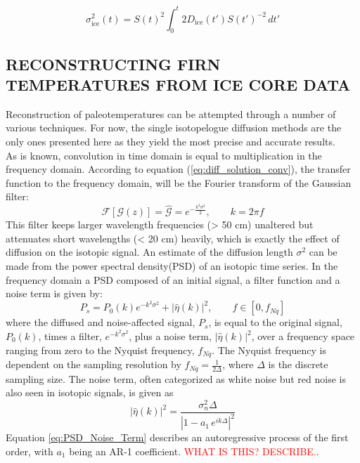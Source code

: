 \documentclass[11pt]{article}
\begin{document}
\begin{equation}
	\sigma^2_{\text{ice}}(t) = S(t)^2 \int_{0}^{t}2 D_{\text{ice}}(t') S(t')^{-2} \, dt'
	\label{eq:Diff_Len_Ice}
\end{equation}
\subsection{RECONSTRUCTING FIRN TEMPERATURES FROM ICE CORE DATA}
Reconstruction of paleotemperatures can be attempted through a number of various techniques. For now, the single isotopelogue diffusion methods are the only ones presented here as they yield the most precise and accurate results. 
\\
As is known, convolution in time domain is equal to multiplication in the frequency domain. According to equation (\ref{eq:diff_solution_conv}), the transfer function to the frequency domain, will be the Fourier transform of the Gaussian filter:
\begin{equation}
	\mathcal{F}[\mathcal{G}(z)] = \hat{\mathcal{G}} = e^{-\frac{k^2\sigma^2}{2}}, \qquad k = 2\pi f
	\label{eq:Transer_Fct}
\end{equation} 
This filter keeps larger wavelength frequencies (> 50 cm) unaltered but attenuates short wavelengths (< 20 cm) heavily, which is exactly the effect of diffusion on the isotopic signal. An estimate of the diffusion length $\sigma^2$ can be made from the power spectral density(PSD) of an isotopic time series. In the frequency domain a PSD composed of an initial signal, a filter function and a noise term is given by:
\begin{equation}
	P_s = P_0(k) e^{-k^2\sigma^2} + |\hat{\eta}(k)|^2, \qquad f \in [0, f_{Nq}]
	\label{eq:PSD_general}
\end{equation} 
where the diffused and noise-affected signal, $P_s$, is equal to the original signal, $P_0(k)$, times a filter, $e^{-k^2\sigma^2}$, plus a noise term, $|\hat{\eta}(k)|^2$, over a frequency space ranging from zero to the Nyquist frequency, $f_{Nq}$. The Nyquist frequency is dependent on the sampling resolution by $f_{Nq} = \frac{1}{2\Delta}$, where $\Delta$ is the discrete sampling size.
The noise term, often categorized as white noise but red noise is also seen in isotopic signals, is given as
\begin{equation}
	|\hat{\eta}(k)|^2 = \frac{\sigma_n^2 \Delta}{|1 - a_1 \, e^{ik\Delta}|^2}
	\label{eq:PSD_Noise_Term}
\end{equation}
Equation \ref{eq:PSD_Noise_Term} describes an autoregressive process of the first order, with $a_1$ being an AR-1 coefficient. \textcolor{red}{WHAT IS THIS? DESCRIBE.}.\\
\end{document}
